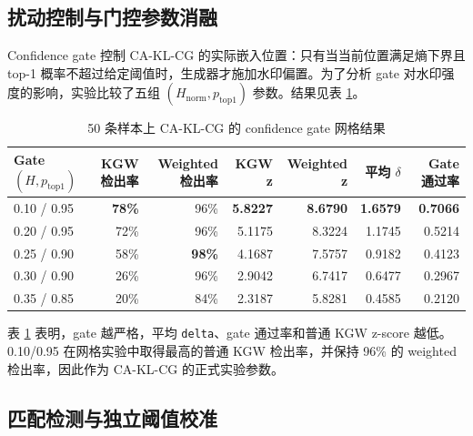 \documentclass[a4paper,UTF8,zihao=5]{ctexart}
\newcommand{\fullmethod}{CA-KL-CG}
\begin{document}
\subsection{扰动控制与门控参数消融}

Confidence gate 控制 \fullmethod{} 的实际嵌入位置：只有当当前位置满足熵下界且 top-1 概率不超过给定阈值时，生成器才施加水印偏置。为了分析 gate 对水印强度的影响，实验比较了五组 $(H_{\text{norm}},p_{\text{top1}})$ 参数。结果见表 \ref{tab:gate-grid}。

\begin{table}[H]
    \centering
    \caption{50 条样本上 \fullmethod{} 的 confidence gate 网格结果}
    \label{tab:gate-grid}
    \scriptsize
    \setlength{\tabcolsep}{3pt}
    \begin{tabularx}{\textwidth}{p{}rrrrrr}
        \toprule
        Gate $(H,p_{\text{top1}})$ & KGW 检出率       & Weighted 检出率  & KGW z           & Weighted z      & 平均 $\delta$     & Gate 通过率        \\
        \midrule
        0.10 / 0.95                & \textbf{78\%} & 96\%          & \textbf{5.8227} & \textbf{8.6790} & \textbf{1.6579} & \textbf{0.7066} \\
        0.20 / 0.95                & 72\%          & 96\%          & 5.1175          & 8.3224          & 1.1745          & 0.5214          \\
        0.25 / 0.90                & 58\%          & \textbf{98\%} & 4.1687          & 7.5757          & 0.9182          & 0.4123          \\
        0.30 / 0.90                & 26\%          & 96\%          & 2.9042          & 6.7417          & 0.6477          & 0.2967          \\
        0.35 / 0.85                & 20\%          & 84\%          & 2.3187          & 5.8281          & 0.4585          & 0.2120          \\
        \bottomrule
    \end{tabularx}
\end{table}

表 \ref{tab:gate-grid} 表明，gate 越严格，平均 \texttt{delta}、gate 通过率和普通 KGW z-score 越低。0.10/0.95 在网格实验中取得最高的普通 KGW 检出率，并保持 96\% 的 weighted 检出率，因此作为 \fullmethod{} 的正式实验参数。

\subsection{匹配检测与独立阈值校准}
\end{document}

